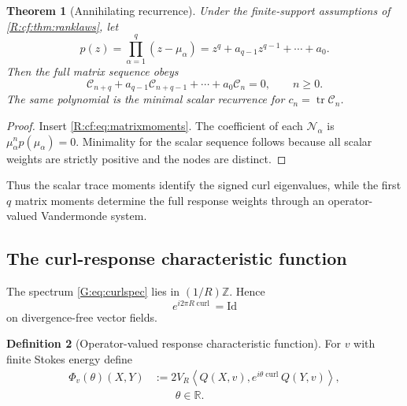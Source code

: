 \documentclass[
 aps,
 prd,
 reprint,
 amsmath,
 amssymb,
 nofootinbib,
 superscriptaddress
]{revtex4-2}
\newtheorem{theorem}{Theorem}[section]
\theoremstyle{definition}
\newtheorem{definition}[theorem]{Definition}
\theoremstyle{remark}
\newcommand{\cC}{\mathscr C}
\newcommand{\cN}{\mathscr N}
\newcommand{\curl}{\operatorname{curl}}
\newcommand{\Id}{\mathrm{Id}}
\newcommand{\tr}{\operatorname{tr}}
\begin{document}
\begin{theorem}[Annihilating recurrence]
\label{R:cf:thm:recurrence}
Under the finite-support assumptions of \cref{R:cf:thm:ranklaws}, let
\begin{equation}
 p(z)
 =
 \prod_{\alpha=1}^q(z-\mu_\alpha)
 =
 z^q+a_{q-1}z^{q-1}+\cdots+a_0.
 \label{R:cf:eq:annpoly}
\end{equation}
Then the full matrix sequence obeys
\begin{equation}
 \boxed{
 \cC_{n+q}
 +
 a_{q-1}\cC_{n+q-1}
 +\cdots+
 a_0\cC_n
 =
 0,
 \qquad
 n\ge0.
 }
 \label{R:cf:eq:matrixrecurrence}
\end{equation}
The same polynomial is the minimal scalar recurrence for
$c_n=\tr\cC_n$.
\end{theorem}

\begin{proof}
Insert \eqref{R:cf:eq:matrixmoments}.  The coefficient of each
$\cN_\alpha$ is
$\mu_\alpha^np(\mu_\alpha)=0$.
Minimality for the scalar sequence follows because all scalar weights are
strictly positive and the nodes are distinct.
\end{proof}

Thus the scalar trace moments identify the signed curl eigenvalues, while
the first $q$ matrix moments determine the full response weights through an
operator-valued Vandermonde system.

\subsection{The curl-response characteristic function}

The spectrum \eqref{G:eq:curlspec} lies in $(1/R)\mathbb Z$.  Hence
\begin{equation}
       e^{i2\pi R\curl}=\Id
 \label{R:cf:eq:periodiccurl}
\end{equation}
on divergence-free vector fields.

\begin{definition}[Operator-valued response characteristic function]
For $v$ with finite Stokes energy define
\begin{equation}
\begin{aligned}
 \Phi_v(\theta)(X,Y)
 &:=
 2V_R
 \left\langle
 Q(X,v),
 e^{i\theta\curl}Q(Y,v)
 \right\rangle,\\
 &\hspace{2em}\theta\in\mathbb R.
\end{aligned}
\label{R:cf:eq:Phi}
\end{equation}
\end{definition}
\end{document}
